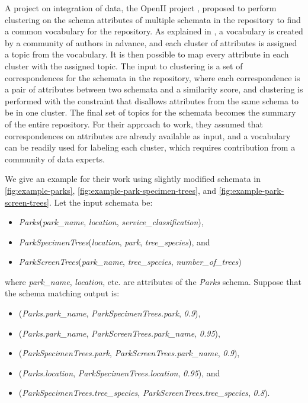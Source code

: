 A project on integration of data, the OpenII project \cite{Smith2011Unity}, proposed to perform clustering on the schema attributes of multiple schemata in the repository to find a common vocabulary for the repository. As explained in \cite{Smith2011Unity}, a vocabulary is created by a community of authors in advance, and each cluster of attributes is assigned a topic from the vocabulary. It is then possible to map every attribute in each cluster with the assigned topic. The input to clustering is a set of correspondences for the schemata in the repository, where each correspondence is a pair of attributes between two schemata and a similarity score, and clustering is performed with the constraint that disallows attributes from the same schema to be in one cluster. The final set of topics for the schemata becomes the summary of the entire repository. For their approach to work, they assumed that correspondences on attributes are already available as input, and a vocabulary can be readily used for labeling each cluster, which requires contribution from a community of data experts.

We give an example for their work using slightly modified schemata in \autoref{fig:example-parks}, \autoref{fig:example-park-specimen-trees}, and \autoref{fig:example-park-screen-trees}. Let the input schemata be:
\begin{itemize}
	\item[] \textit{Parks}(\textit{park\_name}, \textit{location}, \textit{service\_classification}),
	\item[] \textit{ParkSpecimenTrees}(\textit{location}, \textit{park}, \textit{tree\_species}), and
	\item[] \textit{ParkScreenTrees}(\textit{park\_name}, \textit{tree\_species}, \textit{number\_of\_trees})
\end{itemize}
where \textit{park\_name}, \textit{location}, etc. are attributes of the \textit{Parks} schema. Suppose that the schema matching output is:
\begin{itemize}
	\item[] (\textit{Parks.park\_name}, \textit{ParkSpecimenTrees.park}, \textit{0.9}),
	\item[] (\textit{Parks.park\_name}, \textit{ParkScreenTrees.park\_name}, \textit{0.95}),
	\item[] (\textit{ParkSpecimenTrees.park}, \textit{ParkScreenTrees.park\_name}, \textit{0.9}),
	\item[] (\textit{Parks.location}, \textit{ParkSpecimenTrees.location}, \textit{0.95}), and
	\item[] (\textit{ParkSpecimenTrees.tree\_species}, \textit{ParkScreenTrees.tree\_species}, \textit{0.8}).
\end{itemize}

